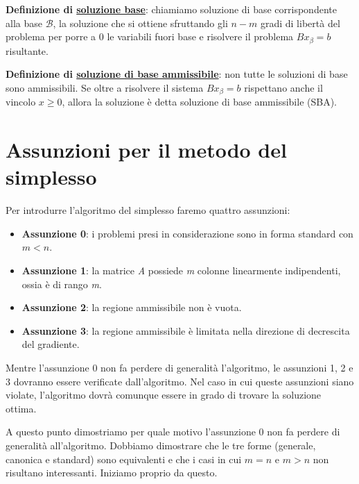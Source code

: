 \documentclass[11pt, oneside]{book}
\begin{document}
\par\bigskip

{\bf Definizione di \underline{soluzione base}}: chiamiamo soluzione
di base corrispondente alla base $\mathcal{B}$, la soluzione che si
ottiene sfruttando gli $n-m$ gradi di libert\`a del problema per
porre a 0 le variabili fuori base e risolvere il problema $Bx_{\beta}
= b$ risultante.

\par\bigskip

{\bf Definizione di \underline{soluzione di base ammissibile}}: non
tutte le soluzioni di base sono ammissibili. Se oltre a risolvere il
sistema $Bx_\beta = b$ rispettano anche il vincolo $x\geq 0$, allora
la soluzione \`e detta soluzione di base ammissibile (SBA).

\section{Assunzioni per il metodo del simplesso}

Per introdurre l'algoritmo del simplesso faremo quattro assunzioni:

\begin{itemize}
\item {\bf Assunzione 0}: i problemi presi in considerazione sono in
  forma standard con $m < n$.

\item {\bf Assunzione 1}: la matrice {\em A} possiede {\em m} colonne
  linearmente indipendenti, ossia \`e di rango {\em m}.

\item {\bf Assunzione 2}: la regione ammissibile non \`e vuota.

\item {\bf Assunzione 3}: la regione ammissibile \`e limitata nella
  direzione di decrescita del gradiente.
\end{itemize}

Mentre l'assunzione 0 non fa perdere di generalit\`a l'algoritmo, le
assunzioni 1, 2 e 3 dovranno essere verificate dall'algoritmo. Nel
caso in cui queste assunzioni siano violate, l'algoritmo dovr\`a
comunque essere in grado di trovare la soluzione ottima.

\par\bigskip

A questo punto dimostriamo per quale motivo l'assunzione 0 non fa
perdere di generalit\`a all'algoritmo. Dobbiamo dimostrare che le tre
forme (generale, canonica e standard) sono equivalenti e che i casi in
cui $m=n$ e $m>n$ non risultano interessanti. Iniziamo proprio da
questo.
\end{document}
